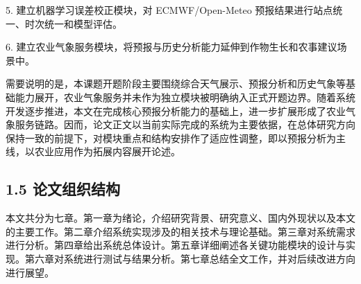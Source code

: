 5. 建立机器学习误差校正模块，对 ECMWF/Open-Meteo 预报结果进行站点统一、时次统一和模型评估。

6. 建立农业气象服务模块，将预报与历史分析能力延伸到作物生长和农事建议场景中。

需要说明的是，本课题开题阶段主要围绕综合天气展示、预报分析和历史气象等基础能力展开，农业气象服务并未作为独立模块被明确纳入正式开题边界。随着系统开发逐步推进，本文在完成核心预报分析能力的基础上，进一步扩展形成了农业气象服务链路。因而，论文正文以当前实际完成的系统为主要依据，在总体研究方向保持一致的前提下，对模块重点和结构安排作了适应性调整，即以预报分析为主线，以农业应用作为拓展内容展开论述。

\subsection{1.5 论文组织结构}

本文共分为七章。第一章为绪论，介绍研究背景、研究意义、国内外现状以及本文的主要工作。第二章介绍系统实现涉及的相关技术与理论基础。第三章对系统需求进行分析。第四章给出系统总体设计。第五章详细阐述各关键功能模块的设计与实现。第六章对系统进行测试与结果分析。第七章总结全文工作，并对后续改进方向进行展望。

